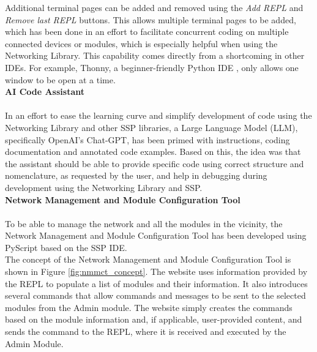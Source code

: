 Additional terminal pages can be added and removed using the \textit{Add REPL} and \textit{Remove last REPL} buttons. This allows multiple terminal pages to be added, which has been done in an effort to facilitate concurrent coding on multiple connected devices or modules, which is especially helpful when using the Networking Library. This capability comes directly from a shortcoming in other IDEs. For example, Thonny, a beginner-friendly Python IDE \citep{annamaa_thonny_2015, aivar_annamaa_thonny_2025, aivar_annamaa_thonny_nodate, annamaa_introducing_2015}, only allows one window to be open at a time.\\

\textbf{\label{sec:methods_configai}AI Code Assistant}\\\\
In an effort to ease the learning curve and simplify development of code using the Networking Library and other SSP libraries, a Large Language Model (LLM), specifically  OpenAI's Chat-GPT, has been primed with instructions, coding documentation and annotated code examples. Based on this, the idea was that the assistant should be able to provide specific code using correct structure and nomenclature, as requested by the user, and help in debugging during development using the Networking Library and SSP. \\

\textbf{\label{sec:methods_nmt}Network Management and Module Configuration Tool}\\\\
To be able to manage the network and all the modules in the vicinity, the Network Management and Module Configuration Tool has been developed using PyScript based on the SSP IDE.\\

The concept of the Network Management and Module Configuration Tool is shown in Figure \ref{fig:nmmct_concept}. The website uses information provided by the REPL to populate a list of modules and their information. It also introduces several commands that allow commands and messages to be sent to the selected modules from the Admin module. The website simply creates the commands based on the module information and, if applicable, user-provided content, and sends the command to the REPL, where it is received and executed by the Admin Module.

